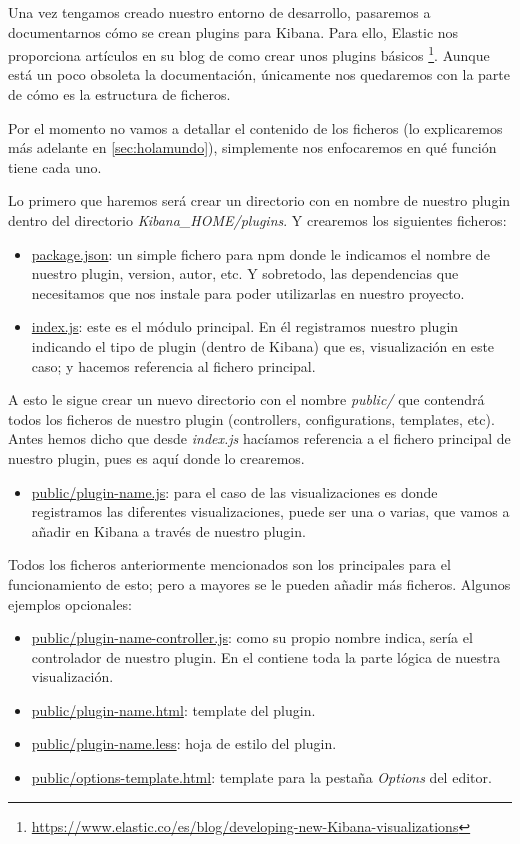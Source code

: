 \documentclass[a4paper, 12pt]{book}
\begin{document}
Una vez tengamos creado nuestro entorno de desarrollo, pasaremos a documentarnos cómo se crean plugins para Kibana. Para ello, Elastic nos proporciona artículos en su blog de como crear unos plugins básicos \footnote{\url{https://www.elastic.co/es/blog/developing-new-Kibana-visualizations}}. Aunque está un poco obsoleta la documentación, únicamente nos quedaremos con la parte de cómo es la estructura de ficheros.

Por el momento no vamos a detallar el contenido de los ficheros (lo explicaremos más adelante en \ref{sec:holamundo}), simplemente nos enfocaremos en qué función tiene cada uno.

Lo primero que haremos será crear un directorio con en nombre de nuestro plugin dentro del directorio \textit{Kibana\_HOME/plugins}. Y crearemos los siguientes ficheros:

\begin{itemize}
    \item \underline{package.json}: un simple fichero para npm donde le indicamos el nombre de nuestro plugin, version, autor, etc. Y sobretodo, las dependencias que necesitamos que nos instale para poder utilizarlas en nuestro proyecto.
    \item \underline{index.js}: este es el módulo principal. En él registramos nuestro plugin indicando el tipo de plugin (dentro de Kibana) que es, visualización en este caso; y hacemos referencia al fichero principal.
\end{itemize}

A esto le sigue crear un nuevo directorio con el nombre \textit{public/} que contendrá todos los ficheros de nuestro plugin (controllers, configurations, templates, etc). Antes hemos dicho que desde \textit{index.js} hacíamos referencia a el fichero principal de nuestro plugin, pues es aquí donde lo crearemos.

\begin{itemize}
    \item \underline{public/plugin-name.js}: para el caso de las visualizaciones es donde registramos las diferentes visualizaciones, puede ser una o varias, que vamos a añadir en Kibana a través de nuestro plugin.
\end{itemize}

Todos los ficheros anteriormente mencionados son los principales para el funcionamiento de esto; pero a mayores se le pueden añadir más ficheros. Algunos ejemplos opcionales:

\begin{itemize}
    \item \underline{public/plugin-name-controller.js}: como su propio nombre indica, sería el controlador de nuestro plugin. En el contiene toda la parte lógica de nuestra visualización.
    \item \underline{public/plugin-name.html}: template del plugin.
    \item \underline{public/plugin-name.less}: hoja de estilo del plugin.
    \item \underline{public/options-template.html}: template para la pestaña \textit{Options} del editor.
\end{itemize}
\end{document}
